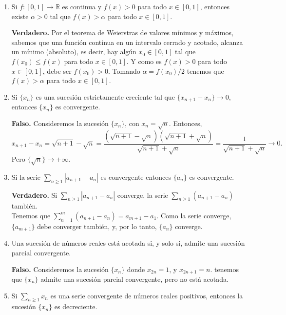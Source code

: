 \documentclass[10pt,a4paper]{article}
\begin{document}
\begin{enumerate}
		\item Si $f : [0, 1] \rightarrow \mathbb{R}$ es continua y $f(x) > 0$ para todo $x \in [0, 1]$, entonces existe $\alpha > 0$ tal que $f(x) > \alpha$ para todo $x \in [0, 1]$.
		
		\textbf{Verdadero. }Por el teorema de Weierstras de valores mínimos y máximos, sabemos que una función continua en un intervalo cerrado y acotado, alcanza un mínimo  (absoluto), es decir, hay algún $x_0 \in [0, 1]$ tal que $f(x_0) \leq f(x)$ para todo $x \in [0, 1]$. Y como es $f(x) > 0$ para todo $x \in [0, 1]$, debe ser $f(x_0) > 0$. Tomando $\alpha = f(x_0) / 2$ tenemos que $f(x) > \alpha$ para todo $x \in [0, 1]$. \newline
		
		\item Si $\{x_n\}$ es una sucesión estrictamente creciente tal que $\{x_{n+1} - x_n\} \rightarrow 0$, entonces $\{x_n\}$ es convergente.
		
		\textbf{Falso. }Consideremos la sucesión $\{x_n\}$, con $x_n = \sqrt{n}$. Entonces, 
		$$x_{n+1} - x_n = \sqrt{n+1} - \sqrt{n} = \dfrac{(\sqrt{n+1} - \sqrt{n})(\sqrt{n+1} + \sqrt{n})}{\sqrt{n+1} + \sqrt{n}} = \dfrac{1}{\sqrt{n+1} + \sqrt{n}} \rightarrow 0.$$
		Pero $\{\sqrt{n}\} \rightarrow + \infty$. \newline
		
		\newpage
		
		\item Si la serie $\displaystyle \sum_{n \geq 1} |a_{n+1} - a_n|$ es convergente entonces $\{a_n\}$ es convergente.
		
		\textbf{Verdadero. } Si $\displaystyle \sum_{n \geq 1} |a_{n+1} - a_n|$ converge, la serie
		$\displaystyle \sum_{n \geq 1} (a_{n+1} - a_n)$ también. \\
		Tenemos que $\displaystyle \sum_{n = 1}^m (a_{n+1} - a_n) = a_{m+1} - a_1$. Como la serie converge, $\{a_{m+1}\}$ debe converger también, y, por lo tanto, $\{a_n\}$ converge. \newline
		
		\item Una sucesión de números reales está acotada si, y solo si, admite una sucesión parcial convergente.
		
		\textbf{Falso. }Consideremos la sucesión $\{x_n\}$ donde $x_{2n} = 1$, y $x_{2n+1} = n$. tenemos que $\{x_n\}$ admite una sucesión parcial convergente, pero no está acotada. \newline
		
		\item Si $\displaystyle \sum_{n \geq 1} x_n$ es una serie convergente de números reales positivos, entonces la sucesión $\{x_n\}$ es decreciente.
		

\end{enumerate}
\end{document}
